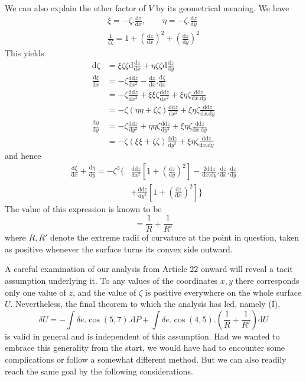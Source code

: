 We can also explain the other factor of $V$ by its geometrical meaning. We have
\[
\begin{gathered}
\xi=-\zeta.\frac{\mathrm{d}z}{\mathrm{d}x},\qquad \eta=-\zeta.\frac{\mathrm{d}z}{\mathrm{d}y}\\
\frac{1}{\zeta\zeta}=1+(\frac{\mathrm{d}z}{\mathrm{d}x})^2+(\frac{\mathrm{d}z}{\mathrm{d}y})^2
\end{gathered}
\]
This yields
\[
\begin{aligned}
\mathrm{d}\zeta&=\xi\zeta\zeta\mathrm{d}\frac{\mathrm{d}z}{\mathrm{d}x}+\eta\zeta\zeta\mathrm{d}\frac{\mathrm{d}z}{\mathrm{d}y}\\
\frac{\mathrm{d}\xi}{\mathrm{d}x}&=-\zeta\frac{\mathrm{dd}z}{\mathrm{d}x^2}-\frac{\mathrm{d}z}{\mathrm{d}x}.\frac{\mathrm{d}\zeta}{\mathrm{d}x}\\
&=-\zeta\frac{\mathrm{dd}z}{\mathrm{d}x^2}+\xi\xi\zeta\frac{\mathrm{dd}z}{\mathrm{d}x^2}+\xi\eta\zeta\frac{\mathrm{dd}z}{\mathrm{d}x.\mathrm{d}y}\\
&=-\zeta(\eta\eta+\zeta\zeta)\frac{\mathrm{dd}z}{\mathrm{d}x^2}+\xi\eta\zeta\frac{\mathrm{dd}z}{\mathrm{d}x.\mathrm{d}y}\\
\frac{\mathrm{d}\eta}{\mathrm{d}y}&=-\zeta\frac{\mathrm{dd}z}{\mathrm{d}y^2}+\eta\eta\zeta\frac{\mathrm{dd}z}{\mathrm{d}y^2}+\xi\eta\zeta\frac{\mathrm{dd}z}{\mathrm{d}x.\mathrm{d}y}\\
&=-\zeta(\xi\xi+\zeta\zeta)\frac{\mathrm{dd}z}{\mathrm{d}y^2}+\xi\eta\zeta\frac{\mathrm{dd}z}{\mathrm{d}x.\mathrm{d}y}
\end{aligned}
\]
and hence
\[
\begin{aligned}
\frac{\mathrm{d}\xi}{\mathrm{d}x}+\frac{\mathrm{d}\eta}{\mathrm{d}y}=-\zeta^3\big\{&\frac{\mathrm{dd}z}{\mathrm{d}x^2}[1+(\frac{\mathrm{d}z}{\mathrm{d}y})^2]-\frac{2\mathrm{dd}z}{\mathrm{d}x.\mathrm{d}y}.\frac{\mathrm{d}z}{\mathrm{d}x}.\frac{\mathrm{d}z}{\mathrm{d}y}\\
&+\frac{\mathrm{dd}z}{\mathrm{d}y^2}[1+(\frac{\mathrm{d}z}{\mathrm{d}x})^2]\big\}
\end{aligned}
\]
The value of this expression is known to be
\[
=\frac{1}{R}+\frac{1}{R'}
\]
where $R,R'$ denote the extreme radii of curvature at the point in question, taken as positive whenever the surface turns its convex side outward.

A careful examination of our analysis from Article 22 onward will reveal a tacit assumption underlying it. To any values of the coordinates $x,y$ there corresponds only one value of $z$, and the value of $\zeta$ is positive everywhere on the whole surface $U$. Nevertheless, the final theorem to which the analysis has led, namely (I),
\[
\delta U=-\int\delta e.\cos(5,7).\mathrm{d}P+\int\delta e.\cos(4,5).(\frac{1}{R}+\frac{1}{R'})\mathrm{d}U
\]
is valid in general and is independent of this assumption. Had we wanted to embrace this generality from the start, we would have had to encounter some complications or follow a somewhat different method. But we can also readily reach the same goal by the following considerations.


